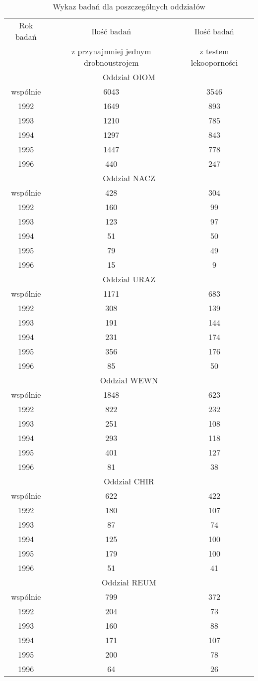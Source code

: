 \documentclass[a4paper,11pt]{article}
\begin{document}
\begin{table}[H]
\begin{center}
\caption{Wykaz badań dla poszczególnych oddziałów}
\begin{tabular}{c|c|c}
\hline
Rok badań & Ilość badań & Ilość badań \\
& z przynajmniej jednym drobnoustrojem &z testem lekooporności \\
\hline \multicolumn{3}{|c|}{Oddział OIOM} \\ \hline
wspólnie &6043 &3546 \\
1992 &1649 &893 \\
1993 &1210 &785 \\
1994 &1297 &843 \\
1995 &1447 &778 \\
1996 &440 &247 \\
\hline \multicolumn{3}{|c|}{Oddział NACZ} \\ \hline
wspólnie &428 &304 \\
1992 &160 &99 \\
1993 &123 &97 \\
1994 &51 &50 \\
1995 &79 &49 \\
1996 &15 &9 \\
\hline \multicolumn{3}{|c|}{Oddział URAZ} \\ \hline
wspólnie &1171 &683 \\
1992 &308 &139 \\
1993 &191 &144 \\
1994 &231 &174 \\
1995 &356 &176 \\
1996 &85 &50 \\
\hline \multicolumn{3}{|c|}{Oddział WEWN} \\ \hline
wspólnie &1848 &623 \\
1992 &822 &232 \\
1993 &251 &108 \\
1994 &293 &118 \\
1995 &401 &127 \\
1996 &81 &38 \\
\hline \multicolumn{3}{|c|}{Oddział CHIR} \\ \hline
wspólnie &622 &422 \\
1992 &180 &107 \\
1993 &87 &74 \\
1994 &125 &100 \\
1995 &179 &100 \\
1996 &51 &41 \\
\hline \multicolumn{3}{|c|}{Oddział REUM} \\ \hline
wspólnie &799 &372 \\
1992 &204 &73 \\
1993 &160 &88 \\
1994 &171 &107 \\
1995 &200 &78 \\
1996 &64 &26 \\

\hline
\end{tabular}
\end{center}
\end{table}
\end{document}
